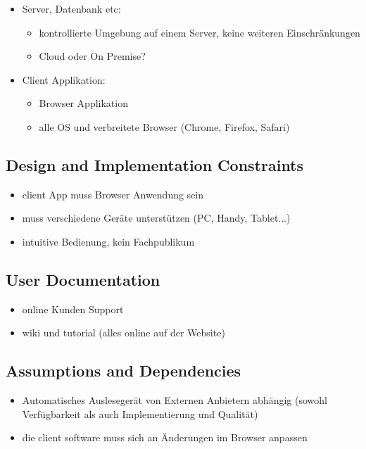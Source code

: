 \begin{itemize}
    \item Server, Datenbank etc: \begin{itemize}
        \item kontrollierte Umgebung auf einem Server, keine weiteren Einschränkungen
        \item Cloud oder On Premise?
    \end{itemize}
    \item Client Applikation: \begin{itemize}
        \item Browser Applikation
        \item alle OS und verbreitete Browser (Chrome, Firefox, Safari) 
    \end{itemize}
\end{itemize}

\subsection{Design and Implementation Constraints}

\begin{itemize}
    \item client App muss Browser Anwendung sein
    \item muss verschiedene Geräte unterstützen (PC, Handy, Tablet...) 
    \item intuitive Bedienung, kein Fachpublikum
\end{itemize}

\subsection{User Documentation}

\begin{itemize}
    \item online Kunden Support
    \item wiki und tutorial (alles online auf der Website)
\end{itemize}

\subsection{Assumptions and Dependencies}

\begin{itemize}
    \item Automatisches Auslesegerät von Externen Anbietern abhängig (sowohl Verfügbarkeit als auch Implementierung und Qualität)
    \item die client software muss sich an Änderungen im Browser anpassen
\end{itemize}
